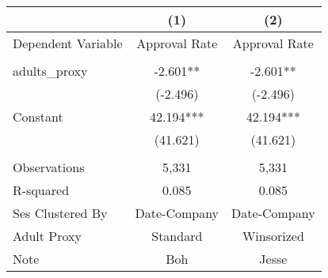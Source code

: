 \begin{tabular}{lcc}
\toprule
{} &            (1) &            (2) \\
\midrule
Dependent Variable &  Approval Rate &  Approval Rate \\
                   &                &                \\
adults\_proxy       &       -2.601** &       -2.601** \\
                   &       (-2.496) &       (-2.496) \\
Constant           &      42.194*** &      42.194*** \\
                   &       (41.621) &       (41.621) \\
                   &                &                \\
Observations       &          5,331 &          5,331 \\
R-squared          &          0.085 &          0.085 \\
Ses Clustered By   &   Date-Company &   Date-Company \\
Adult Proxy        &       Standard &     Winsorized \\
Note               &            Boh &          Jesse \\
\bottomrule
\end{tabular}
